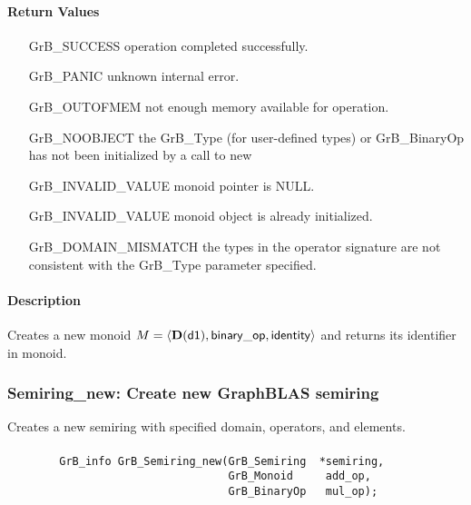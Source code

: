 \paragraph{Return Values}

\begin{itemize}[leftmargin=2.1in]
\item[{\sf GrB\_SUCCESS}]           operation completed successfully.
\item[{\sf GrB\_PANIC}]             unknown internal error.
\item[{\sf GrB\_OUTOFMEM}]          not enough memory available for operation.
\item[{\sf GrB\_NOOBJECT}]          the {\sf GrB\_Type} (for user-defined types)
                                    or {\sf GrB\_BinaryOp} has not been
                                    initialized by a call to {\sf new}
\item[{\sf GrB\_INVALID\_VALUE}]    {\sf monoid} pointer is {\sf NULL}.
\item[{\sf GrB\_INVALID\_VALUE}]    {\sf monoid} object is already initialized.
\item[{\sf GrB\_DOMAIN\_MISMATCH}]  the types in the operator signature are not   
                                    consistent with the {\sf GrB\_Type} parameter specified.
\end{itemize}

\paragraph{Description}

Creates a new monoid $M = \langle \bold{D}({\sf d1}), 
{\sf binary\_op}, {\sf identity} \rangle$ and
returns its identifier in {\sf monoid}.


\subsubsection{{\sf Semiring\_new}: Create new GraphBLAS semiring}

Creates a new semiring with specified domain, operators, and elements.

\paragraph{\syntax}

\begin{verbatim}
        GrB_info GrB_Semiring_new(GrB_Semiring  *semiring,
                                  GrB_Monoid     add_op,
                                  GrB_BinaryOp   mul_op);
\end{verbatim}

